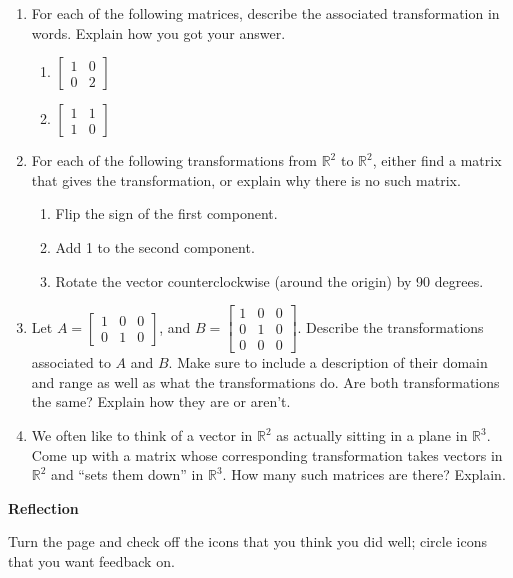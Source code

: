 \documentclass[11pt]{report}
\newcommand{\R}{\mathbb{R}}
\newcommand{\mat}[1]{\begin{bmatrix}#1\end{bmatrix}}
\begin{document}
\begin{enumerate}
	
	\item For each of the following matrices, describe the associated transformation in words.  Explain how you got your answer.
	\begin{enumerate}
		\item $\mat{1 & 0 \\ 0 & 2}$
		\item $\mat{1 & 1 \\ 1 & 0}$
	\end{enumerate}
	
	\item For each of the following transformations from $\R^2$ to $\R^2$, either find a matrix that gives the transformation, or explain why there is no such matrix.
	\begin{enumerate}
		\item Flip the sign of the first component.
		\item Add 1 to the second component.
		\item Rotate the vector counterclockwise (around the origin) by 90 degrees.
	\end{enumerate}
	
	\item Let $A = \mat{1 & 0 & 0 \\ 0 & 1 & 0}$, and $B = \mat{1 & 0 & 0 \\ 0 & 1 & 0 \\ 0 & 0 & 0}$. Describe the transformations associated to $A$ and $B$. Make sure to include a description of their domain and range as well as what the transformations do.  Are both transformations the same? Explain how they are or aren't.
	
	\item We often like to think of a vector in $\R^2$ as actually sitting in a plane in $\R^3$.  Come up with a matrix whose corresponding transformation takes vectors in $\R^2$ and ``sets them down'' in $\R^3$.  How many such matrices are there?  Explain.
\end{enumerate}



\vspace{0.5in}

\begin{center}{\Large{\textbf{Reflection\\}}}

Turn the page and check off the icons that you think you did well; circle icons that you want feedback on. \end{center}
\end{document}
